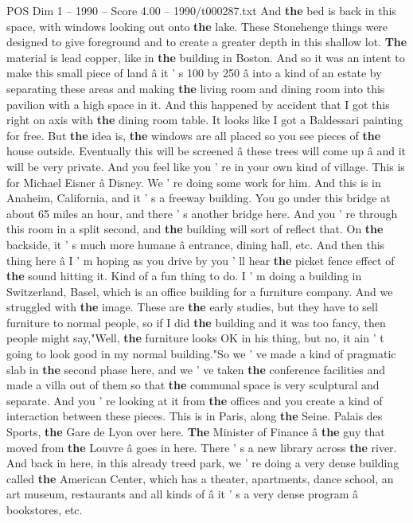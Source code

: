 \begin{textsample}{POS Dim 1 – 1990 – Score 4.00 – 1990/t000287.txt}
And \textbf{the} bed is back in this space, with windows looking out onto \textbf{the} lake.
These Stonehenge things were designed to give foreground and to create a greater depth in this shallow lot. \textbf{The} material is lead copper, like in \textbf{the} building in Boston.
And so it was an intent to make this small piece of land â it ' s 100 by 250 â into a kind of an estate by separating these areas and making \textbf{the} living room and dining room into this pavilion with a high space in it.
And this happened by accident that I got this right on axis with \textbf{the} dining room table.
It looks like I got a Baldessari painting for free.
But \textbf{the} idea is, \textbf{the} windows are all placed so you see pieces of \textbf{the} house outside.
Eventually this will be screened â these trees will come up â and it will be very private.
And you feel like you ' re in your own kind of village.
This is for Michael Eisner â Disney.
We ' re doing some work for him.
And this is in Anaheim, California, and it ' s a freeway building.
You go under this bridge at about 65 miles an hour, and there ' s another bridge here.
And you ' re through this room in a split second, and \textbf{the} building will sort of reflect that.
On \textbf{the} backside, it ' s much more humane â entrance, dining hall, etc.
And then this thing here â I ' m hoping as you drive by you ' ll hear \textbf{the} picket fence effect of \textbf{the} sound hitting it.
Kind of a fun thing to do.
I ' m doing a building in Switzerland, Basel, which is an office building for a furniture company.
And we struggled with \textbf{the} image.
These are \textbf{the} early studies, but they have to sell furniture to normal people, so if I did \textbf{the} building and it was too fancy, then people might say,"Well, \textbf{the} furniture looks OK in his thing, but no, it ain ' t going to look good in my normal building."So we ' ve made a kind of pragmatic slab in \textbf{the} second phase here, and we ' ve taken \textbf{the} conference facilities and made a villa out of them so that \textbf{the} communal space is very sculptural and separate.
And you ' re looking at it from \textbf{the} offices and you create a kind of interaction between these pieces.
This is in Paris, along \textbf{the} Seine.
Palais des Sports, \textbf{the} Gare de Lyon over here. \textbf{The} Minister of Finance â \textbf{the} guy that moved from \textbf{the} Louvre â goes in here.
There ' s a new library across \textbf{the} river.
And back in here, in this already treed park, we ' re doing a very dense building called \textbf{the} American Center, which has a theater, apartments, dance school, an art museum, restaurants and all kinds of â it ' s a very dense program â bookstores, etc.

\end{textsample}

